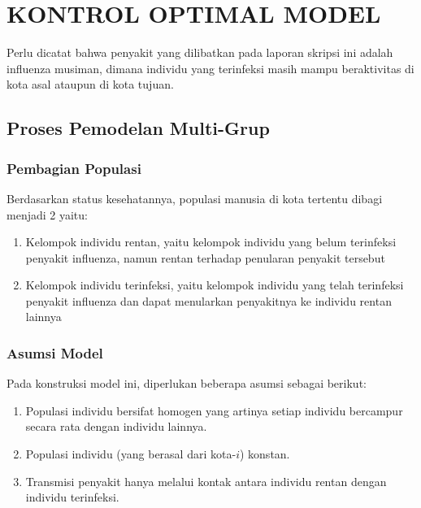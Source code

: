 \chapter{\normalsize KONTROL OPTIMAL MODEL}

Perlu dicatat bahwa penyakit yang dilibatkan pada laporan skripsi ini adalah influenza musiman, dimana individu yang terinfeksi masih mampu beraktivitas di kota asal ataupun di kota tujuan.

\section{Proses Pemodelan Multi-Grup}
\subsection{Pembagian Populasi}
Berdasarkan status kesehatannya, populasi manusia di kota tertentu dibagi menjadi 2 yaitu:
\begin{enumerate}
	\item Kelompok individu rentan, yaitu kelompok individu yang belum terinfeksi penyakit influenza, namun rentan terhadap penularan penyakit tersebut
	\item Kelompok individu terinfeksi, yaitu kelompok individu yang telah terinfeksi penyakit influenza dan dapat menularkan penyakitnya ke individu rentan lainnya
\end{enumerate}

\subsection{Asumsi Model}
Pada konstruksi model ini, diperlukan beberapa asumsi sebagai berikut:
\begin{enumerate}
	\item Populasi individu bersifat homogen yang artinya setiap individu bercampur secara rata dengan individu lainnya.
	\item Populasi individu (yang berasal dari kota-$i$) konstan.
	\item Transmisi penyakit hanya melalui kontak antara individu rentan dengan individu terinfeksi.
\end{enumerate}

